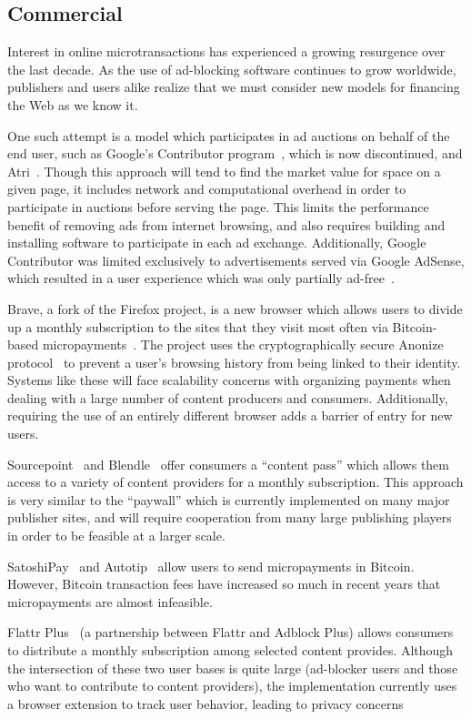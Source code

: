 \subsection{Commercial}
Interest in online microtransactions has experienced a growing resurgence over the last decade.
As the use of ad-blocking software continues to grow worldwide, publishers and users alike realize that we must consider new models for financing the Web as we know it.

One such attempt is a model which participates in ad auctions on behalf of the end user, such as Google's Contributor program~\cite{contributor}, which is now discontinued, and Atri~\cite{atri}.
Though this approach will tend to find the market value for space on a given page, it includes network and computational overhead in order to participate in auctions before serving the page.
This limits the performance benefit of removing ads from internet browsing, and also requires building and installing software to participate in each ad exchange.
Additionally, Google Contributor was limited exclusively to advertisements served via Google AdSense, which resulted in a user experience which was only partially ad-free~\cite{adsense}.

Brave, a fork of the Firefox project, is a new browser which allows users to divide up a monthly subscription to the sites that they visit most often via Bitcoin-based micropayments~\cite{brave}.
The project uses the cryptographically secure Anonize protocol~\cite{anonize} to prevent a user's browsing history from being linked to their identity.
Systems like these will face scalability concerns with organizing payments when dealing with a large number of content producers and consumers.
Additionally, requiring the use of an entirely different browser adds a barrier of entry for new users.

Sourcepoint~\cite{sourcepoint} and Blendle~\cite{blendle} offer consumers a “content pass” which allows them access to a variety of content providers for a monthly subscription.
This approach is very similar to the ``paywall'' which is currently implemented on many major publisher sites, and will require cooperation from many large publishing players in order to be feasible at a larger scale.

SatoshiPay~\cite{satoshi} and Autotip~\cite{autotip} allow users to send micropayments in Bitcoin.
However, Bitcoin transaction fees have increased so much in recent years that micropayments are almost infeasible.

Flattr Plus~\cite{flattrplus} (a partnership between Flattr and Adblock Plus) allows consumers to distribute a monthly subscription among selected content provides.
Although the intersection of these two user bases is quite large (ad-blocker users and those who want to contribute to content providers), the implementation currently uses a browser extension to track user behavior, leading to privacy concerns
